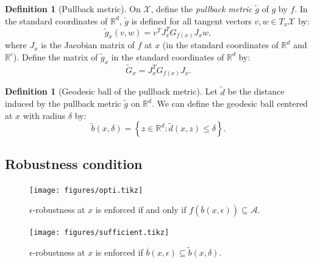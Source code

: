 \documentclass[entropy,article,submit,pdftex,moreauthors]{Definitions/mdpi}
\newcommand{\R}{\ensuremath{\mathbb{R}}}
\theoremstyle{plain}
\theoremstyle{definition}
\newtheorem{definition}[theorem]{Definition}
\newcommand{\A}{\mathcal{A}}
\newcommand{\X}{\mathcal{X}}
\begin{document}
\begin{definition}[Pullback metric]
    On $\X$, define the \emph{pullback metric} $\tilde{g}$ of $g$ by $f$. In the standard coordinates of $\R^d$, $\tilde{g}$ is defined for all tangent vectors $v,w \in T_x\X$ by:
    \begin{equation*}
        \tilde{g}_x(v,w) = v^T J_x^T G_{f(x)} J_x w,
    \end{equation*}
    where $J_x$ is the Jacobian matrix of $f$ at $x$ (in the standard coordinates of $\R^d$ and $\R^c$). Define the matrix of $\tilde{g}_x$ in the standard coordinates of $\R^d$ by:
    \begin{equation}
        \widetilde{G}_x = J_x^T G_{f(x)} J_x.
    \end{equation}
\end{definition}

\begin{definition}[Geodesic ball of the pullback metric]
    Let $\tilde{d}$ be the distance induced by the pullback metric $\tilde{g}$ on $\R^d$. We can define the geodesic ball centered at $x$ with radius $\delta$ by:
    \begin{equation*}
        \tilde{b}(x, \delta) = \left\{ z \in \R^d : \tilde{d}(x, z) \leq \delta \right\}.
    \end{equation*}
\end{definition}

\subsection{Robustness condition}
\label{sec:res}

\begin{figure}%
    \begin{minipage}{0.42\textwidth}
        \centering
        \texttt{[image: figures/opti.tikz]}
        \caption{$\epsilon$-robustness at $x$ is enforced if and only if $f(\overline{b}(x, \epsilon)) \subseteq \A$.}
        \label{fig:opti}
    \end{minipage}\hfill
    \begin{minipage}{0.42\textwidth}
        \centering
        \texttt{[image: figures/sufficient.tikz]}
        \caption{$\epsilon$-robustness at $x$ is enforced if $\overline{b}(x, \epsilon) \subseteq \tilde{b}(x, \delta)$.}
        \label{fig:sufficient}
    \end{minipage}
    \vspace{-1em}
\end{figure}
\end{document}
